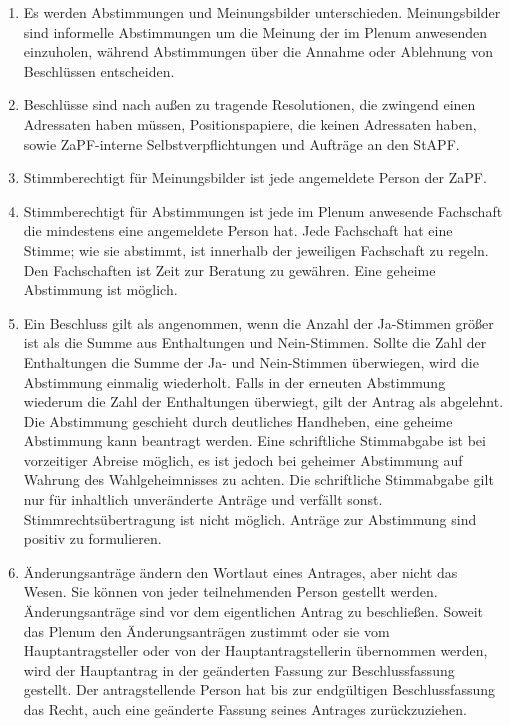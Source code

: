 \documentclass[draft,12pt,oneside]{scrreprt}
\begin{document}
\begin{enumerate}
\item Es werden Abstimmungen und Meinungsbilder unterschieden. Meinungsbilder
      sind informelle Abstimmungen um die Meinung der im Plenum anwesenden
      einzuholen, während Abstimmungen über die Annahme oder Ablehnung von
      Beschlüssen entscheiden.

\item Beschlüsse sind nach außen zu tragende Resolutionen, die zwingend einen
      Adressaten haben müssen, Positionspapiere, die keinen Adressaten haben,
      sowie ZaPF-interne Selbstverpflichtungen und Aufträge an den StAPF.

\item Stimmberechtigt für Meinungsbilder ist jede angemeldete Person der ZaPF.

\item Stimmberechtigt für Abstimmungen ist jede im Plenum anwesende Fachschaft
      die mindestens eine angemeldete Person hat.
      Jede Fachschaft hat eine Stimme; wie sie abstimmt, ist innerhalb der
      jeweiligen Fachschaft zu regeln.
      Den Fachschaften ist Zeit zur Beratung zu gewähren.
      Eine geheime Abstimmung ist möglich.

\item Ein Beschluss gilt als angenommen, wenn die Anzahl der Ja-Stimmen größer
      ist als die Summe aus Enthaltungen und Nein-Stimmen.
      Sollte die Zahl der Enthaltungen die Summe der Ja- und Nein-Stimmen
      überwiegen, wird die Abstimmung einmalig wiederholt.
      Falls in der erneuten Abstimmung wiederum die Zahl der Enthaltungen
      überwiegt, gilt der Antrag als abgelehnt.
      Die Abstimmung geschieht durch deutliches Handheben, eine geheime
      Abstimmung kann beantragt werden.
      Eine schriftliche Stimmabgabe ist bei vorzeitiger Abreise möglich, es ist
      jedoch bei geheimer Abstimmung auf Wahrung des Wahlgeheimnisses zu achten.
      Die schriftliche Stimmabgabe gilt nur für inhaltlich unveränderte Anträge
      und verfällt sonst.
      Stimmrechtsübertragung ist nicht möglich.
      Anträge zur Abstimmung sind positiv zu formulieren.

\item Änderungsanträge ändern den Wortlaut eines Antrages, aber nicht das Wesen.
      Sie können von jeder teilnehmenden Person gestellt werden.
      Änderungsanträge sind vor dem eigentlichen Antrag zu beschließen.
      Soweit das Plenum den Änderungsanträgen zustimmt oder sie vom
      Hauptantragsteller oder von der Hauptantragstellerin übernommen werden,
      wird der Hauptantrag in der geänderten Fassung zur Beschlussfassung gestellt.
      Der antragstellende Person hat bis zur endgültigen Beschlussfassung das Recht,
      auch eine geänderte Fassung seines Antrages zurückzuziehen.


\end{enumerate}
\end{document}
